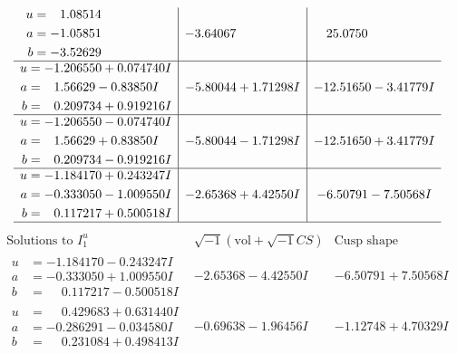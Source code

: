\documentclass[1p]{elsarticle_modified}
\theoremstyle{definition}
\newcommand{\I}{\sqrt{-1}}
\begin{document}
$$\begin{array}{c|c|c}
\begin{aligned}
u &= \phantom{-}1.08514\phantom{ +0.000000I} \\
a &= -1.05851\phantom{ +0.000000I} \\
b &= -3.52629\phantom{ +0.000000I}\end{aligned}
 & -3.64067\phantom{ +0.000000I} & \phantom{-}25.0750\phantom{ +0.000000I} \\ \hline\begin{aligned}
u &= -1.206550 + 0.074740 I \\
a &= \phantom{-}1.56629 - 0.83850 I \\
b &= \phantom{-}0.209734 + 0.919216 I\end{aligned}
 & -5.80044 + 1.71298 I & -12.51650 - 3.41779 I \\ \hline\begin{aligned}
u &= -1.206550 - 0.074740 I \\
a &= \phantom{-}1.56629 + 0.83850 I \\
b &= \phantom{-}0.209734 - 0.919216 I\end{aligned}
 & -5.80044 - 1.71298 I & -12.51650 + 3.41779 I \\ \hline\begin{aligned}
u &= -1.184170 + 0.243247 I \\
a &= -0.333050 - 1.009550 I \\
b &= \phantom{-}0.117217 + 0.500518 I\end{aligned}
 & -2.65368 + 4.42550 I & -6.50791 - 7.50568 I\\
 \hline 
 \end{array}$$\newpage$$\begin{array}{c|c|c}  
\text{Solutions to }I^u_{1}& \I (\text{vol} + \sqrt{-1}CS) & \text{Cusp shape}\\
 \hline 
\begin{aligned}
u &= -1.184170 - 0.243247 I \\
a &= -0.333050 + 1.009550 I \\
b &= \phantom{-}0.117217 - 0.500518 I\end{aligned}
 & -2.65368 - 4.42550 I & -6.50791 + 7.50568 I \\ \hline\begin{aligned}
u &= \phantom{-}0.429683 + 0.631440 I \\
a &= -0.286291 - 0.034580 I \\
b &= \phantom{-}0.231084 + 0.498413 I\end{aligned}
 & -0.69638 - 1.96456 I & -1.12748 + 4.70329 I \\ \hline\begin{aligned}

\end{aligned}
\end{array}$$
\end{document}
